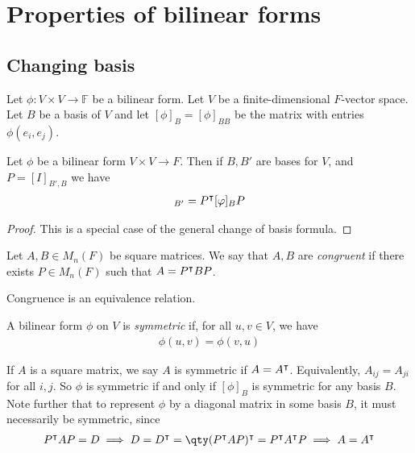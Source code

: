 \section{Properties of bilinear forms}

\subsection{Changing basis}
Let $\phi \colon V \times V \to \mathbb F$ be a bilinear form.
Let $V$ be a finite-dimensional $F$-vector space.
Let $B$ be a basis of $V$ and let $[\phi]_B = [\phi]_{BB}$ be the matrix with entries $\phi(e_i, e_j)$.
\begin{lemma}
	Let $\phi$ be a bilinear form $V \times V \to F$.
	Then if $B, B'$ are bases for $V$, and $P = [I]_{B', B}$ we have
	\begin{align*}
		[\phi]_{B'} = P^\transpose [\phi]_B P
	\end{align*}
\end{lemma}
\begin{proof}
	This is a special case of the general change of basis formula.
\end{proof}
\begin{definition}
	Let $A, B \in M_n(F)$ be square matrices.
	We say that $A, B$ are \textit{congruent} if there exists $P \in M_n(F)$ such that $A = P^\intercal B P$.
\end{definition}
\begin{remark}
	Congruence is an equivalence relation.
\end{remark}
\begin{definition}
	A bilinear form $\phi$ on $V$ is \textit{symmetric} if, for all $u, v \in V$, we have
	\begin{align*}
		\phi(u,v) = \phi(v,u)
	\end{align*}
\end{definition}
\begin{remark}
	If $A$ is a square matrix, we say $A$ is symmetric if $A = A^\intercal$.
	Equivalently, $A_{ij} = A_{ji}$ for all $i, j$.
	So $\phi$ is symmetric if and only if $[\phi]_B$ is symmetric for any basis $B$.
	Note further that to represent $\phi$ by a diagonal matrix in some basis $B$, it must necessarily be symmetric, since
	\begin{align*}
		P^\transpose A P = D \implies D = D^\transpose = \qty(P^\transpose A P)^\transpose = P^\transpose A^\transpose P \implies A = A^\transpose
	\end{align*}
\end{remark}

